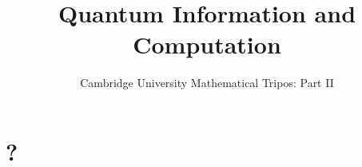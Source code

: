 \documentclass{article}
\title{Quantum Information and Computation}
\author{Cambridge University Mathematical Tripos: Part II}
\begin{document}
\maketitle

\tableofcontentsnewpage{}

\section{?}
\end{document}
